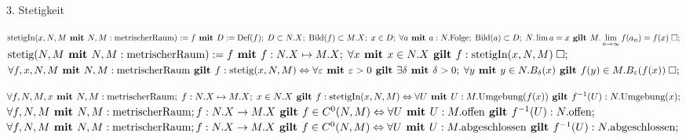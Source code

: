 \documentclass{article}
\begin{document}
\begin{flashcard}[]{3. Stetigkeit}


  \backside

$\text{stetigIn}(x, N, M \with N, M : \text{metrischerRaum}):= f \with D := \text{Def}(f); \; D \subset N.X; \; \text{Bild}(f) \subset M.X; \; x \in D; \; \forall a \with a : N. \text{Folge}; \; \text{Bild}(a) \subset D; \; N.\lim a = x \then M.\lim \limits_{n \to \infty} f(a_{n}) = f(x) \; \Box;$\\

$\text{stetig}(N, M \with N, M : \text{metrischerRaum}):= f \with f : N.X \mapsto M.X; \; \forall x \with x \in N.X \then f : \text{stetigIn}(x, N, M) \; \Box;$\\

$\forall f, x, N, M \with N, M : \text{metrischerRaum} \then f : \text{stetig}(x, N, M ) \Leftrightarrow \forall \varepsilon \with \varepsilon > 0 \then \exists \delta \with \delta > 0; \; \forall y \with y \in N.B_{\delta}(x) \then f(y) \in M.B_{\varepsilon}(f(x)) \; \Box;$\\

\newpage

$\forall f, N, M, x \with N, M : \text{metrischerRaum}; \; f : N.X \mapsto M.X; \; x \in N.X \then f : \text{stetigIn}(x, N, M ) \Leftrightarrow \forall U \with U : M. \text{Umgebung}(f(x)) \then f^{-1}(U) : N. \text{Umgebung}(x);$\\

$\forall f, N, M \with N, M : \text{metrischerRaum}; f : N.X \rightarrow M.X \then f \in C^{0}(N, M) \Leftrightarrow \forall U \with U : M. \text{offen} \then f^{-1}(U) : N. \text{offen};$\\

$\forall f, N, M \with N, M : \text{metrischerRaum}; f : N.X \rightarrow M.X \then f \in C^{0}(N, M) \Leftrightarrow \forall U \with U : M. \text{abgeschlossen} \then f^{-1}(U) : N. \text{abgeschlossen};$

\end{flashcard}
\end{document}
